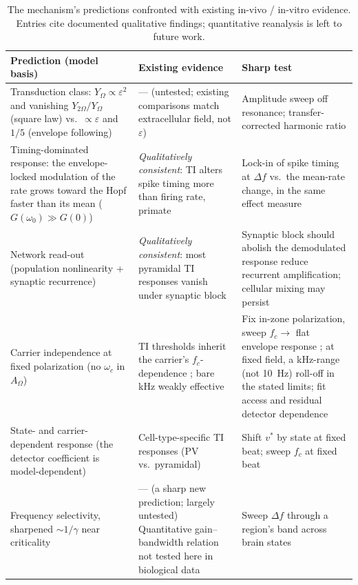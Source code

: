 \documentclass[11pt,a4paper]{article}
\providecommand{\DIFaddtex}[1]{{\protect\color{blue} \sf #1}} %
\providecommand{\DIFdeltex}[1]{{\protect\color{red} \scriptsize #1}} %
\providecommand{\DIFaddFL}[1]{\DIFadd{#1}} %
\providecommand{\DIFdelFL}[1]{\DIFdel{#1}} %
\providecommand{\DIFaddbeginFL}{} %
\providecommand{\DIFaddendFL}{} %
\providecommand{\DIFdelbeginFL}{} %
\providecommand{\DIFdelendFL}{} %
\providecommand{\DIFadd}[1]{\texorpdfstring{\DIFaddtex{#1}}{#1}} %
\providecommand{\DIFdel}[1]{\texorpdfstring{\DIFdeltex{#1}}{}} %
\begin{document}
\begin{table}[h]
\centering\small
\renewcommand{\arraystretch}{1.25}
\DIFdelbeginFL %
\DIFdelendFL \DIFaddbeginFL \begin{tabular}{@{}>{\raggedright\arraybackslash}p{} >{\raggedright\arraybackslash}p{} >{\raggedright\arraybackslash}p{}@{}}
\DIFaddendFL \toprule
\textbf{Prediction (model basis)} & \textbf{Existing evidence} & \textbf{Sharp test} \\
\midrule
Transduction class: $Y_\Omega\propto\varepsilon^2$ and vanishing $Y_{2\Omega}/Y_\Omega$
(square law) vs.\ $\propto\varepsilon$ and $1/5$ (envelope following) & --- (untested;
existing comparisons match extracellular field, not $\varepsilon$) & Amplitude sweep off
resonance; transfer-corrected harmonic ratio \\
Timing-dominated response: the envelope-locked modulation of the rate grows toward
the Hopf faster than its mean ($G(\omega_0)\!\gg\!G(0)$) & \emph{Qualitatively
consistent}: TI alters spike timing more than firing rate, primate \cite{vieira2024} &
Lock-in of spike timing at $\Delta f$ vs.\ the mean-rate change, in the same effect
measure \\
Network read-out (population nonlinearity + synaptic recurrence) &
\emph{Qualitatively consistent}: most pyramidal TI responses vanish under synaptic block
\cite{caldas2024} & Synaptic block should \DIFdelbeginFL \DIFdelFL{abolish the demodulated response }\DIFdelendFL \DIFaddbeginFL \DIFaddFL{reduce recurrent amplification; cellular
mixing may persist }\DIFaddendFL \\
Carrier independence at fixed polarization (no $\omega_c$ in $A_\Omega$) & TI thresholds
inherit the carrier's $f_c$-dependence \cite{opancar2025,peripheral2023}; bare kHz weakly
effective \cite{esmaeilpour2020} & Fix in-zone polarization, sweep $f_c\!\to$ flat envelope
response \DIFdelbeginFL \DIFdelFL{; at fixed field, a kHz-range (not 10~Hz) roll-off }\DIFdelendFL \DIFaddbeginFL \DIFaddFL{in the stated limits; fit access and residual detector dependence }\DIFaddendFL \\
State- and carrier-dependent response (the detector coefficient is model-dependent) &
Cell-type-specific TI responses (PV vs.\ pyramidal) \cite{caldas2024} & Shift $v^*$ by
state at fixed beat; sweep $f_c$ at fixed beat \\
Frequency selectivity, sharpened $\sim1/\gamma$ near criticality & \DIFdelbeginFL \DIFdelFL{--- (a sharp new
prediction; largely untested) }\DIFdelendFL \DIFaddbeginFL \DIFaddFL{Quantitative
gain--bandwidth relation not tested here in biological data }\DIFaddendFL & Sweep $\Delta f$ through a region's band across brain
states \\
\bottomrule
\end{tabular}
\caption{The mechanism's predictions confronted with existing in-vivo / in-vitro evidence.
Entries cite documented qualitative findings; quantitative reanalysis is left to future
work.}\label{tab:predictions}
\end{table}
\end{document}
